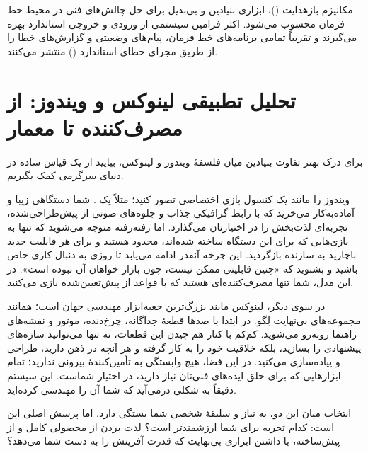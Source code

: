 مکانیزم بازهدایت ()، ابزاری بنیادین و بی‌بدیل برای حل چالش‌های فنی در محیط خط فرمان محسوب می‌شود. اکثر فرامین سیستمی از ورودی و خروجی استاندارد بهره می‌گیرند و تقریباً تمامی برنامه‌های خط فرمان، پیام‌های وضعیتی و گزارش‌های خطا را از طریق مجرای خطای استاندارد () منتشر می‌کنند.

\section{تحلیل تطبیقی لینوکس و ویندوز: از مصرف‌کننده تا معمار}

برای درک بهتر تفاوت بنیادین میان فلسفهٔ ویندوز و لینوکس، بیایید از یک قیاس ساده در دنیای سرگرمی کمک بگیریم.

ویندوز را مانند یک کنسول بازی اختصاصی تصور کنید؛ مثلاً یک . شما دستگاهی زیبا و آماده‌به‌کار می‌خرید که با رابط گرافیکی جذاب و جلوه‌های صوتی از پیش‌طراحی‌شده، تجربه‌ای لذت‌بخش را در اختیارتان می‌گذارد. اما رفته‌رفته متوجه می‌شوید که تنها به بازی‌هایی که برای این دستگاه ساخته شده‌اند، محدود هستید و برای هر قابلیت جدید ناچارید به سازنده بازگردید. این چرخه آنقدر ادامه می‌یابد تا روزی به دنبال کاری خاص باشید و بشنوید که «چنین قابلیتی ممکن نیست، چون بازار خواهان آن نبوده است». در این مدل، شما تنها مصرف‌کننده‌ای هستید که با قواعد از پیش‌تعیین‌شده بازی می‌کنید.

در سوی دیگر، لینوکس مانند بزرگ‌ترین جعبه‌ابزار مهندسی جهان است؛ همانند مجموعه‌های بی‌نهایت لِگو. در ابتدا با صدها قطعهٔ جداگانه، چرخ‌دنده، موتور و نقشه‌های راهنما روبه‌رو می‌شوید. کم‌کم با کنار هم چیدن این قطعات، نه تنها می‌توانید سازه‌های پیشنهادی را بسازید، بلکه خلاقیت خود را به کار گرفته و هر آنچه در ذهن دارید، طراحی و پیاده‌سازی می‌کنید. در این فضا، هیچ وابستگی به تأمین‌کنندهٔ بیرونی ندارید؛ تمام ابزارهایی که برای خلق ایده‌های فنی‌تان نیاز دارید، در اختیار شماست. این سیستم دقیقاً به شکلی درمی‌آید که شما آن را مهندسی کرده‌اید.

انتخاب میان این دو، به نیاز و سلیقهٔ شخصی شما بستگی دارد. اما پرسش اصلی این است: کدام تجربه برای شما ارزشمندتر است؟ لذت بردن از محصولی کامل و از پیش‌ساخته، یا داشتن ابزاری بی‌نهایت که قدرت آفرینش را به دست شما می‌دهد؟
